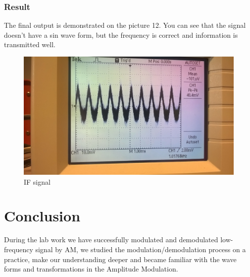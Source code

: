 \documentclass[english]{article}
\begin{document}
\subsubsection{Result}
The final output is demonstrated on the picture 12. You can see that the signal doesn't have a sin wave form, but the frequency is correct and information is transmitted well.
\begin{figure}[H]
\centerline{\includegraphics[scale=0.1]{AM/12Result}}
\caption{IF signal}
\end{figure}
\section{Conclusion}
During the lab work we have successfully modulated and demodulated low-frequency signal by AM, we studied the modulation/demodulation process on a practice, make our understanding deeper and became familiar with the wave forms and transformations in the Amplitude Modulation.
\end{document}
